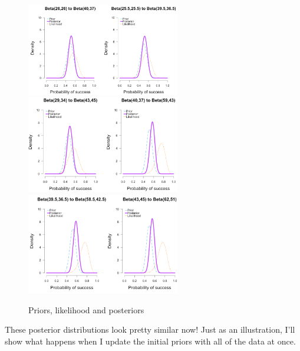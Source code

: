 \FloatBarrier


\begin{figure}[h]
    \centering
\includegraphics[width=0.6\textwidth]{pic/p05c03-snip09.png}
\includegraphics[width=0.6\textwidth]{pic/p05c03-snip10.png}
\includegraphics[width=0.6\textwidth]{pic/p05c03-snip11.png}
    \caption{Priors, likelihood and posteriors}
    \label{fig:p05c03-snip09}
\end{figure}

These posterior distributions look pretty similar now! Just as an illustration, I'll show what happens when I update the initial priors with all of the data at once.



